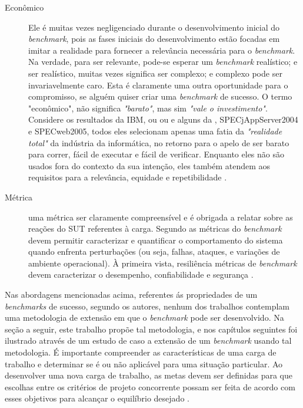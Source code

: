 \begin{description}
	\item[Econômico] Ele é muitas vezes negligenciado durante o desenvolvimento inicial do \textit{benchmark}, pois as fases iniciais do desenvolvimento estão focadas em imitar a realidade para fornecer a relevância necessária para o \textit{benchmark}. Na verdade, para ser relevante, pode-se esperar um \textit{benchmark} realístico; e ser realístico, muitas vezes significa ser complexo; e complexo pode ser invariavelmente caro. Esta é claramente uma outra oportunidade para o compromisso, se alguém quiser criar uma \textit{benchmark} de sucesso. O termo "econômico", não significa \textit{"barato"}, mas sim \textit{"vale o investimento"}.
	Considere os resultados da IBM,  ou   ou   e alguns da , SPECjAppServer2004 e  SPECweb2005, todos eles selecionam apenas uma fatia da \textit{"realidade total"} da indústria da informática, no retorno para o apelo de ser barato para correr, fácil de executar e fácil de verificar. Enquanto eles não são usados fora do contexto da sua intenção, eles também atendem aos requisitos para a relevância, equidade e repetibilidade \cite{Huppler2009}. 
	
	\item[Métrica] uma métrica ser claramente compreensível e é obrigada a relatar sobre as reações do SUT referentes à carga. Segundo  as métricas do \textit{benchmark} devem permitir caracterizar e quantificar o comportamento do sistema quando enfrenta perturbações (ou seja, falhas, ataques, e variações de ambiente operacional). À primeira vista, resiliência métricas de \textit{benchmark} devem caracterizar o desempenho, confiabilidade e segurança \cite{Marco2012}.
	
\end{description}

Nas abordagens mencionadas acima, referentes ás propriedades de um \textit{benchmarks} de sucesso, segundo os autores, nenhum dos trabalhos contemplam uma metodologia de extensão em que o \textit{benchmark} pode ser desenvolvido. Na seção a seguir, este trabalho propõe tal metodologia, e nos capítulos seguintes foi ilustrado através de um estudo de caso a extensão de um \textit{benchmark} usando tal metodologia. É importante compreender as características de uma carga de trabalho e determinar se é ou não aplicável para uma situação particular. Ao desenvolver uma nova carga de trabalho, as metas devem ser definidas para que escolhas entre os critérios de projeto concorrente possam ser feita de acordo com esses objetivos para alcançar o equilíbrio desejado \cite{Kistowski2015}.

